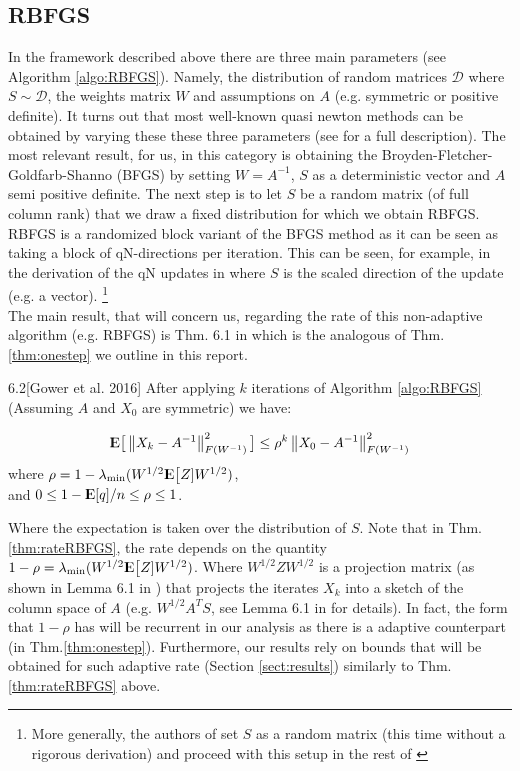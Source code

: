\documentclass[12pt,conference,compsocconf]{IEEEtran}
\newcommand\norm[1]{\left\lVert#1\right\rVert}
\newcommand{\E}{{\rm I\kern-.3em E}}
\begin{document}
\subsection{RBFGS}\label{sect:rbfgsbackground}
In the framework described above there are three main parameters (see Algorithm \ref{algo:RBFGS}). Namely, the distribution of random matrices $\mathcal{D}$ where $S\sim \mathcal{D}$, the weights matrix $W$ and assumptions on $A$ (e.g. symmetric or  positive definite). It turns out that most well-known quasi newton methods can be obtained by varying these these three parameters (see \cite{Gower1} for a full description). The most relevant result, for us, in this category is obtaining the Broyden-Fletcher-Goldfarb-Shanno (BFGS) by setting $W=A^{-1}$, $S$ as a deterministic vector and $A$ semi positive definite. The next step is to let $S$ be a random matrix (of full column rank) that we draw a fixed distribution for which we obtain RBFGS. RBFGS is a randomized block variant of the BFGS method as it can be seen as taking a block of qN-directions per iteration. This can be seen, for example, in the derivation of the qN updates in \cite{Gratton} where $S$ is the scaled direction of the update (e.g. a vector). \footnote{More generally, the authors of \cite{Gratton} set $S$ as a random matrix (this time without a rigorous derivation) and proceed with this setup in the rest of \cite{Gratton}}\\
The main result, that will concern us, regarding the rate of this non-adaptive algorithm (e.g. RBFGS) is Thm. 6.1 in \cite{Gower1} which is the analogous of Thm. \ref{thm:onestep} we outline in this report.

\begin{customthm}{6.2}[Gower et al. 2016]\label{thm:rateRBFGS}
After applying $k$ iterations of Algorithm \ref{algo:RBFGS} (Assuming $A$ and $X_0$ are symmetric) we have:

\begin{align}\label{eq:progressRBFGS}
	\E\big[\norm{X_{k}-A^{-1}}^2_{F(W^{-1})}\big]\leq \rho^k \norm{X_0-A^{-1}}^2_{F(W^{-1})}
\end{align}
where $\rho=1-\lambda_{\text{min}}(W^{1/2}\E\big[Z]W^{1/2})$, \\ 
and $0\leq 1 - \E [q]/n \leq \rho \leq 1$.
\end{customthm}
Where the expectation is taken over the distribution of $S$. Note that in Thm. \ref{thm:rateRBFGS}, the rate depends on the quantity $1-\rho =\lambda_{\text{min}}(W^{1/2}\E\big[Z]W^{1/2})$. Where $W^{1/2}ZW^{1/2}$ is a projection matrix (as shown in Lemma 6.1 in \cite{Gower1}) that projects the iterates $X_k$ into a sketch of the column space of $A$ (e.g. $W^{1/2}A^TS$, see Lemma 6.1 in \cite{Gower1} for details). In fact, the form that $1-\rho$ has will be recurrent in our analysis as there is a adaptive counterpart (in Thm.\ref{thm:onestep}). Furthermore, our results rely on bounds that will be obtained for such adaptive rate (Section \ref{sect:results}) similarly to Thm.\ref{thm:rateRBFGS} above.
\end{document}
